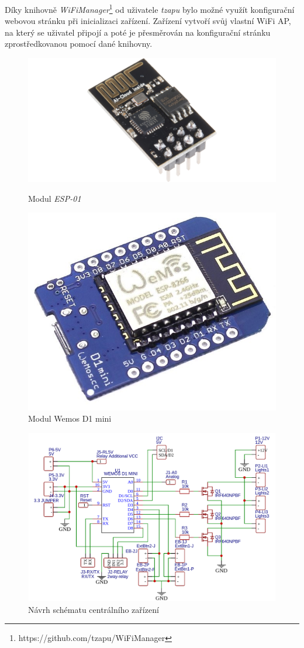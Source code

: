 Díky knihovně \emph{WiFiManager}\footnote{https://github.com/tzapu/WiFiManager} od uživatele \emph{tzapu} bylo možné využít konfigurační webovou stránku při inicializaci zařízení.
Zařízení vytvoří svůj vlastní WiFi AP, na který se uživatel připojí a poté je přesměrován na konfigurační stránku zprostředkovanou pomocí dané knihovny.

\begin{figure}[hbt]
  \centering
  \includegraphics[width=.8\linewidth]{obrazky-figures/esp-01.png}
  \caption{Modul \emph{ESP-01}}
  \label{figure:esp01}
  \endminipage

  \hfill
  \centering
  \includegraphics[width=.7\linewidth]{obrazky-figures/wemos.jpg}
  \caption{Modul Wemos D1 mini}
  \label{figure:wemos}
  \endminipage
\end{figure}

\begin{figure}[hbt]
  \centering
  \includegraphics[width=1 \linewidth]{obrazky-figures/schematic.png}
  \caption{Návrh schématu centrálního zařízení}
  \label{figure:schema}
\end{figure}

